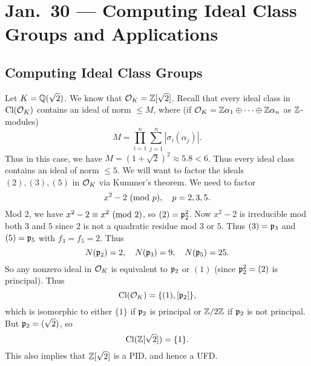 \chapter{Jan.~30 --- Computing Ideal Class Groups and Applications}

\section{Computing Ideal Class Groups}

\begin{example}
  Let $K = \mathbb{Q}(\sqrt{2})$. We know that
  $\mathcal{O}_K = \mathbb{Z}[\sqrt{2}]$. Recall that every ideal
  class in $\operatorname{Cl}(\mathcal{O}_K)$ contains an ideal of
  norm $\le M$, where (if
  $\mathcal{O}_K = \mathbb{Z} \alpha_1 \oplus \dots \oplus \mathbb{Z} \alpha_n$
  as $\mathbb{Z}$-modules)
  \[
    M = \prod_{i = 1}^n \sum_{j = 1}^n |\sigma_{i}(\alpha_j)|.
  \]
  Thus in this case, we have
  $M = (1 + \sqrt{2})^2 \approx 5.8 < 6$. Thus
  every ideal class contains an ideal of norm
  $\le 5$. We will want to factor the
  ideals $(2), (3), (5)$ in $\mathcal{O}_K$ via Kummer's
  theorem. We need to factor
  \[
    x^2 - 2 \ (\mathrm{mod}\ p), \quad p = 2, 3, 5.
  \]
  Mod $2$, we have $x^2 - 2 \equiv x^2 \ (\mathrm{mod}\ 2)$,
  so $(2) = \mathfrak{p}_2^2$. Now $x^2 - 2$ is irreducible mod
  both $3$ and $5$ since $2$ is not a quadratic residue
  mod $3$ or $5$. Thus $(3) = \mathfrak{p}_3$ and
  $(5) = \mathfrak{p}_5$ with $f_3 = f_5 = 2$. Thus
  \[
    N(\mathfrak{p}_2) = 2, \quad N(\mathfrak{p}_3) = 9, \quad N(\mathfrak{p}_5) = 25.
  \]
  So any nonzero ideal in $\mathcal{O}_K$ is equivalent to
  $\mathfrak{p}_2$ or $(1)$ (since $\mathfrak{p}_2^2 = (2)$ is principal).
  Thus
  \[
    \operatorname{Cl}(\mathcal{O}_K) = \{(1), [\mathfrak{p}_2]\},
  \]
  which is isomorphic to either
  $\{1\}$ if $\mathfrak{p}_2$ is principal or
  $\mathbb{Z} / 2\mathbb{Z}$ if $\mathfrak{p}_2$ is not principal. But
  $\mathfrak{p}_2 = (\sqrt{2})$, so
  \[\operatorname{Cl}(\mathbb{Z}[\sqrt{2}]) = \{1\}.\]
  This also implies that $\mathbb{Z}[\sqrt{2}]$ is a PID,
  and hence a UFD.
\end{example}

